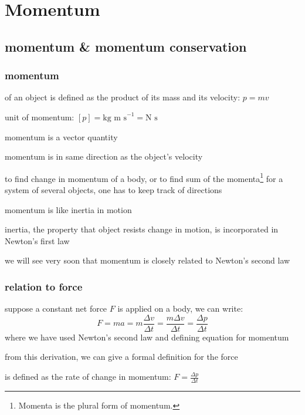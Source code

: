 \section{Momentum}

\subsection{momentum \& momentum conservation}

\subsubsection{momentum}

\begin{ilight}
	 of an object is defined as the product of its mass and its velocity: $\boxed{p=mv}$ 
\end{ilight}

\cmt unit of momentum: $[p]=\text{kg m s}^{-1} = \text{N s}$

\cmt momentum is a vector quantity

momentum is in same direction as the object's velocity

to find change in momentum of a body, or to find sum of the momenta\footnote{Momenta is the plural form of momentum.} for a system of several objects, one has to keep track of directions

\cmt momentum is like inertia in motion

inertia, the property that object resists change in motion, is incorporated in Newton's first law

we will see very soon that momentum is closely related to Newton's second law

\subsubsection{relation to force}

suppose a constant net force $F$ is applied on a body, we can write:
\begin{equation*}
	F = ma = m\frac{\Delta v}{\Delta t} = \frac{m\Delta v}{\Delta t} = \frac{\Delta p}{\Delta t}
\end{equation*}
where we have used Newton's second law and defining equation for momentum

from this derivation, we can give a formal definition for the force

\begin{ilight}
	 is defined as the rate of change in momentum: $\boxed{F = \frac{\Delta p}{\Delta t}}$ 
\end{ilight}





